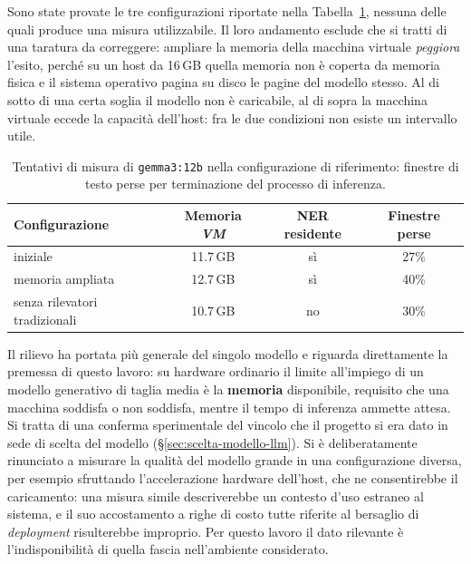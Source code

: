 Sono state provate le tre configurazioni riportate nella Tabella~\ref{tab:test-12b-memoria}, nessuna delle quali produce una misura utilizzabile. Il loro andamento esclude che si tratti di una taratura da correggere: ampliare la memoria della macchina virtuale \emph{peggiora} l'esito, perché su un host da 16\,GB quella memoria non è coperta da memoria fisica e il sistema operativo pagina su disco le pagine del modello stesso. Al di sotto di una certa soglia il modello non è caricabile, al di sopra la macchina virtuale eccede la capacità dell'host: fra le due condizioni non esiste un intervallo utile.

\begin{table}
	\centering
	\caption{Tentativi di misura di \texttt{gemma3:12b} nella configurazione di riferimento: finestre di testo perse per terminazione del processo di inferenza.}
	\label{tab:test-12b-memoria}
	\small
	\begin{tabular}{|l|c|c|c|}
		\hline
		\textbf{Configurazione}       & \textbf{Memoria \textit{VM}} & \textbf{NER residente} & \textbf{Finestre perse} \\
		\hline
		iniziale                      & 11.7\,GB                     & sì                     & 27\%                    \\
		\hline
		memoria ampliata              & 12.7\,GB                     & sì                     & 40\%                    \\
		\hline
		senza rilevatori tradizionali & 10.7\,GB                     & no                     & 30\%                    \\
		\hline
	\end{tabular}
\end{table}

Il rilievo ha portata più generale del singolo modello e riguarda direttamente la premessa di questo lavoro: su hardware ordinario il limite all'impiego di un modello generativo di taglia media è la \textbf{memoria} disponibile, requisito che una macchina soddisfa o non soddisfa, mentre il tempo di inferenza ammette attesa. Si tratta di una conferma sperimentale del vincolo che il progetto si era dato in sede di scelta del modello (§\ref{sec:scelta-modello-llm}). Si è deliberatamente rinunciato a misurare la qualità del modello grande in una configurazione diversa, per esempio sfruttando l'accelerazione hardware dell'host, che ne consentirebbe il caricamento: una misura simile descriverebbe un contesto d'uso estraneo al sistema, e il suo accostamento a righe di costo tutte riferite al bersaglio di \textit{deployment} risulterebbe improprio. Per questo lavoro il dato rilevante è l'indisponibilità di quella fascia nell'ambiente considerato.

